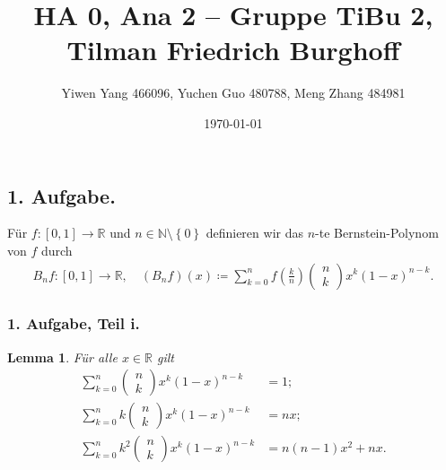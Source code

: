 \documentclass[draft,a5paper]{article}
\author{Yiwen Yang 466096, Yuchen Guo 480788, Meng Zhang 484981}
\date{\today}
\title{HA 0, Ana 2 -- Gruppe TiBu 2, Tilman Friedrich Burghoff}
\newtheorem*{lem}{Lemma}
\begin{document}
\maketitle

\newpage

\subsection*{1. Aufgabe.}
Für \(f \colon [0, 1] \to \mathbb{R}\) und
\(n \in \mathbb{N} \setminus \left\{ 0 \right\}\) definieren wir das
\(n\)-te Bernstein-Polynom von \(f\) durch
\begin{align*}
  B_n f \colon [0, 1] \to \mathbb{R}, \quad (B_n f)(x) \coloneq \sum_{k=0}^n
  {f \left( \frac{k}{n} \right)
  \begin{pmatrix} n \\ k \end{pmatrix} x^k (1-x)^{n - k}}.
\end{align*}

\subsubsection*{1. Aufgabe, Teil i.}

\begin{lem}
  Für alle \(x \in \mathbb{R}\) gilt
  \begin{align}
    \label{eq:1}
    \sum_{k = 0}^{n}
    {\begin{pmatrix} n \\ k \end{pmatrix} x^k (1 - x)^{n - k}} &= 1; \\
    \label{eq:2}
    \sum_{k=0}^n{k \begin{pmatrix} n \\ k \end{pmatrix} x^k (1 -
    x)^{n - k}} &= n x; \\
    \label{eq:3}
    \sum_{k=0}^n{k^2 \begin{pmatrix} n \\ k \end{pmatrix} x^k (1 -
    x)^{n - k}} &= n (n - 1) x^2 + n x.
  \end{align}
\end{lem}
\end{document}

